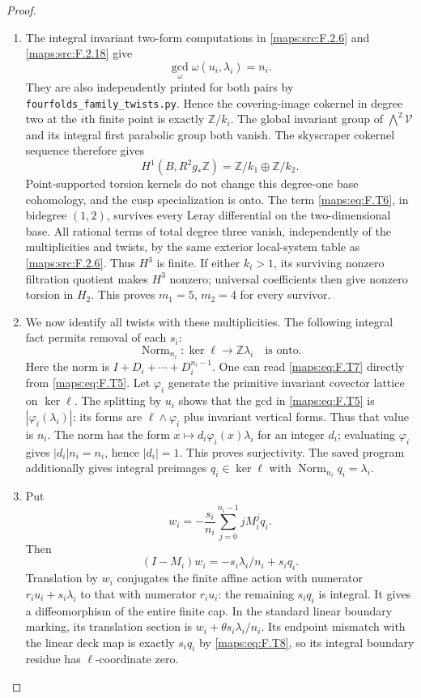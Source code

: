 \begin{proof}
\begin{enumerate}[label=\arabic*.]
\item The integral invariant two-form computations in \ref{maps:src:F.2.6} and
\ref{maps:src:F.2.18} give
\[
 \gcd_{\omega}\omega(u_i,\lambda_i)=n_i.
 \tag{F.T5}\label{maps:eq:F.T5}
\]
They are also independently printed for both pairs by
\texttt{fourfolds\_family\_twists.py}.
Hence the covering-image cokernel in degree two at the
$i$th finite point is exactly $\mathbb Z/k_i$.
The global invariant group of $\bigwedge^2\mathcal V$
and its integral first parabolic group both vanish.
The skyscraper cokernel sequence therefore gives
\[
 H^1(B,R^2g_*\mathbb Z)
       =\mathbb Z/k_1\oplus\mathbb Z/k_2.
 \tag{F.T6}\label{maps:eq:F.T6}
\]
Point-supported torsion kernels do not change this degree-one
base cohomology, and the cusp specialization is onto.
The term \eqref{maps:eq:F.T6}, in bidegree $(1,2)$, survives every Leray
differential on the two-dimensional base.
All rational terms of total degree three vanish, independently
of the multiplicities and twists, by the same exterior
local-system table as \ref{maps:src:F.2.6}.  Thus $H^3$ is finite.
If either $k_i>1$, its surviving nonzero filtration quotient
makes $H^3$ nonzero; universal coefficients then give
nonzero torsion in $H_2$.
This proves $m_1=5$, $m_2=4$ for every survivor.

\item We now identify all twists with these multiplicities.
The following integral fact permits removal of each $s_i$:
\[
 \operatorname{Norm}_{n_i}:
 \ker\ell\longrightarrow\mathbb Z\lambda_i
 \quad\text{is onto}.
 \tag{F.T7}\label{maps:eq:F.T7}
\]
Here the norm is $I+D_i+\cdots+D_i^{n_i-1}$.
One can read \eqref{maps:eq:F.T7} directly from \eqref{maps:eq:F.T5}.
Let $\varphi_i$ generate the primitive invariant covector
lattice on $\ker\ell$.
The splitting by $u_i$ shows that the gcd in \eqref{maps:eq:F.T5} is
$|\varphi_i(\lambda_i)|$: its forms are
$\ell\wedge\varphi_i$ plus invariant vertical forms.
Thus that value is $n_i$.
The norm has the form
$x\mapsto d_i\varphi_i(x)\lambda_i$ for an integer
$d_i$; evaluating $\varphi_i$ gives
$|d_i|n_i=n_i$, hence $|d_i|=1$.
This proves surjectivity.  The saved program additionally
gives integral preimages $q_i\in\ker\ell$ with
$\operatorname{Norm}_{n_i}q_i=\lambda_i$.

\item Put
\[
 w_i=-\frac{s_i}{n_i}\sum_{j=0}^{n_i-1}jM_i^j q_i.
\]
Then
\[
 (I-M_i)w_i=-s_i\lambda_i/n_i+s_iq_i.
 \tag{F.T8}\label{maps:eq:F.T8}
\]
Translation by $w_i$ conjugates the finite affine action
with numerator $r_i u_i+s_i\lambda_i$ to that with
numerator $r_i u_i$: the remaining $s_iq_i$ is integral.
It gives a diffeomorphism of the entire finite cap.
In the standard linear boundary marking, its translation
section is
$w_i+\theta s_i\lambda_i/n_i$.
Its endpoint mismatch with the linear deck map is exactly
$s_iq_i$ by \eqref{maps:eq:F.T8}, so its integral boundary residue has
$\ell$-coordinate zero.


\end{enumerate}
\end{proof}
